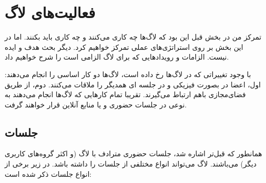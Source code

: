 \section{فعالیت‌های لاگ}

تمرکز من در بخش قبل این بود که لاگ‌ها چه کاری می‌کنند و چه کاری باید بکنند.
اما در این بخش بر روی استراتژی‌های عملی تمرکز خواهیم کرد. دیگر بحث هدف
و ایده نیست. الزامات و رویدادهایی که برای لاگ الزامی است را شرح خواهیم داد.

با وجود تغییراتی که در لاگ‌ها رخ داده است، لاگ‌ها دو کار اساسی را انجام می‌دهند:
اول، اعضا در بصورت فیزیکی و در جلسه ای همدیگر را ملاقات می‌کنند. دوم،
از طریق فضای‌مجازی باهم ارتباط می‌گیرند.
تقریبا تمام کارهایی که لاگ‌ها انجام می‌دهند به نوعی در جلسات حضوری و یا منابع آنلاین
قرار خواهند گرفت.

\subsection{جلسات}

همانطور که قبل‌تر اشاره شد، جلسات حضوری مترادف با لاگ
(و اکثر گروه‌های کاربری دیگر) می‌باشند. لاگ می‌تواند انواع مختلفی از جلسات را داشته باشد.
در زیر برخی از انواع جلسات ذکر شده است:

